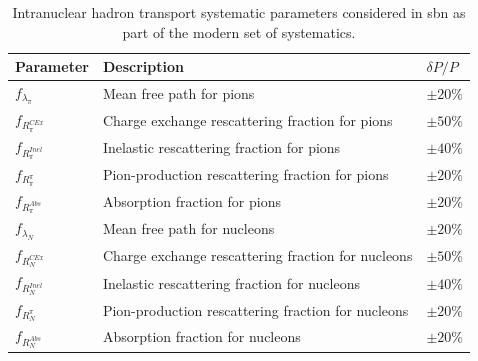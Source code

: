 \begin{table}[!h]
    \renewcommand{\arraystretch}{1.4}
    \begin{tabular}{p{1.9cm} p{9.25cm} p{2.06cm}}
        \toprule
         Parameter & Description & $\delta P / P$ \\
        \midrule
        
         $f_{\lambda_{\pi}}$   &  Mean free path for pions & $ \pm 20 \% $ \\
        
         $f_{R^{CEx}_{\pi}}$    &  Charge exchange rescattering fraction for pions & $ \pm 50 \% $ \\
        
         $f_{R^{Inel}_{\pi}}$   &  Inelastic rescattering fraction for pions & $ \pm 40 \% $ \\
        
         $f_{R^{\pi}_{\pi}}$    &  Pion-production rescattering fraction for pions & $ \pm 20 \% $ \\
        
         $f_{R^{Abs}_{\pi}}$    &  Absorption fraction for pions & $ \pm 20 \% $ \\
        
         $f_{\lambda_{N}}$     &  Mean free path for nucleons & $ \pm 20 \% $ \\
        
         $f_{R^{CEx}_{N}}$      &  Charge exchange rescattering fraction for nucleons & $ \pm 50 \%$ \\
        
         $f_{R^{Inel}_{N}}$     &  Inelastic rescattering fraction for nucleons & $ \pm 40 \% $ \\
        
         $f_{R^{\pi}_{N}}$      &  Pion-production rescattering fraction for nucleons & $ \pm 20 \% $ \\
        
         $f_{R^{Abs}_{N}}$      &  Absorption fraction for nucleons & $ \pm 20 \% $ \\

        \bottomrule
    \end{tabular}
    \caption[Intranuclear hadron transport systematic parameters.]{Intranuclear hadron transport systematic parameters  considered in \gls{sbn} as part of the modern set of systematics\cite{GENIE_manual}.}
    \label{table:modern_intranuclear_syst}
\end{table}

